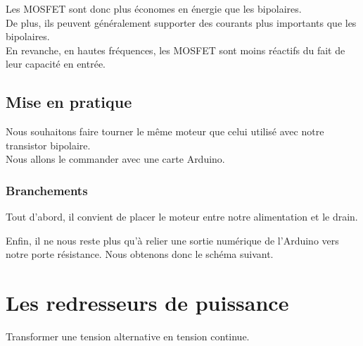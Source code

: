 {    Les MOSFET sont donc plus économes en énergie que les bipolaires.\\
    De plus, ils peuvent généralement supporter des courants plus importants que les bipolaires.\\

    En revanche, en hautes fréquences, les MOSFET sont moins réactifs du fait de leur capacité en entrée.
     \subsection{Mise en pratique}

     Nous souhaitons faire tourner le même moteur que celui utilisé avec notre transistor bipolaire.\\
     Nous allons le commander avec une carte Arduino.

     \subsubsection{Branchements}

     Tout d'abord, il convient de placer le moteur entre notre alimentation et le drain.\\
     
 
 
     Enfin, il ne nous reste plus qu'à relier une sortie numérique de l'Arduino vers notre porte  résistance. Nous obtenons donc le schéma suivant.
 



\section{Les redresseurs de puissance}

Transformer une tension alternative en tension continue.




}
